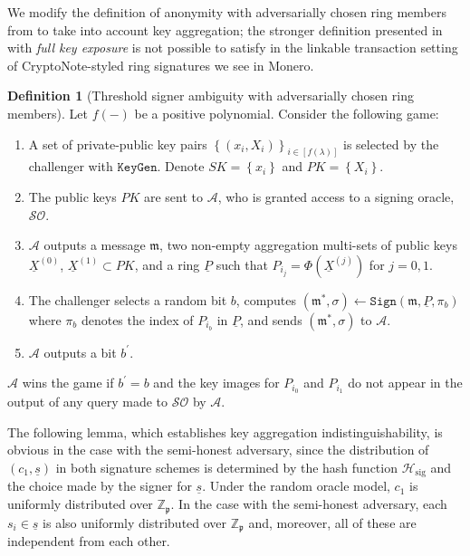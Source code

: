 \documentclass{iacrtrans}
\theoremstyle{definition}
\numberwithin{theorem}{subsection}
\numberwithin{lemma}{theorem}
\newtheorem{defn}[theorem]{Definition}
\newcommand{\adversary}{\mathcal{A}}
\begin{document}
We modify the definition of anonymity with adversarially chosen ring members from \cite{bender2006ring} to take into account key aggregation; the stronger definition presented in \cite{bender2006ring} with \textit{full key exposure} is not possible to satisfy in the linkable transaction setting of CryptoNote-styled ring signatures we see in Monero.

\begin{defn}[Threshold signer ambiguity with adversarially chosen ring members]
Let $f(-)$ be a positive polynomial. Consider the following game:
\begin{enumerate}
\item A set of private-public key pairs $\left\{(x_i, X_i)\right\}_{i\in [f(\lambda)]}$ is selected by the challenger with $\texttt{KeyGen}$. Denote $SK = \left\{x_i\right\}$ and $PK = \left\{X_i\right\}$. 

\item The public keys $PK$ are sent to $\adversary$, who is granted access to a signing oracle, $\mathcal{SO}$.

\item $\adversary$ outputs a message $\mathfrak{m}$,  two non-empty aggregation multi-sets of public keys $\underline{X}^{(0)}$, $\underline{X}^{(1)} \subset PK$, and a ring $\underline{P}$ such that $P_{i_j} = \Phi(\underline{X}^{(j)})$ for $j = 0, 1$.

\item The challenger selects a random bit $b$, computes $(\mathfrak{m}^*, \sigma) \leftarrow \texttt{Sign}(\mathfrak{m}, \underline{P}, \pi_b)$ where $\pi_b$ denotes the index of $P_{i_b}$ in $\underline{P}$, and sends $(\mathfrak{m}^*, \sigma)$ to $\adversary$.

\item $\adversary$ outputs a bit $b^\prime$. 
\end{enumerate} $\adversary$ wins the game if $b^\prime = b$ and the key images for $P_{i_0}$ and $P_{i_1}$ do not appear in the output of any query made to $\mathcal{SO}$ by $\adversary$.
\end{defn} 

The following lemma, which establishes key aggregation indistinguishability, is obvious in the case with the semi-honest adversary, since the distribution of $(c_1, \underline{s})$ in both signature schemes is determined by the hash function $\mathcal{H}_{\text{sig}}$ and the choice made by the signer for $\underline{s}$. Under the random oracle model, $c_1$ is uniformly distributed over $\mathbb{Z}_\mathfrak{p}$. In the case with the semi-honest adversary, each $s_i \in \underline{s}$ is also uniformly distributed over $\mathbb{Z}_\mathfrak{p}$ and, moreover, all of these are independent from each other. 
\end{document}
